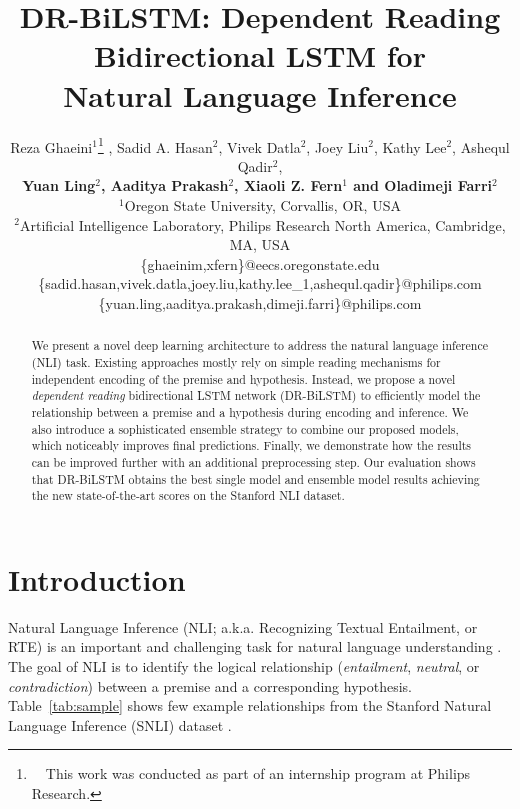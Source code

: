 \documentclass[11pt,a4paper]{article}
\title{DR-BiLSTM: Dependent Reading Bidirectional LSTM for \\ Natural Language Inference}
\author{
	Reza Ghaeini$^1$\thanks{\ \ This work was conducted as part of an internship program at Philips Research.} , Sadid A. Hasan$^2$, Vivek Datla$^2$, Joey Liu$^2$, Kathy Lee$^2$, Ashequl Qadir$^2$, \\ 
	\textbf{Yuan Ling$^2$, Aaditya Prakash$^2$, Xiaoli Z. Fern$^1$ and Oladimeji Farri$^2$} \\
	$^1$Oregon State University, Corvallis, OR, USA \\
	$^2$Artificial Intelligence Laboratory, Philips Research North America, Cambridge, MA, USA \\
	\{ghaeinim,xfern\}@eecs.oregonstate.edu \\
	\{sadid.hasan,vivek.datla,joey.liu,kathy.lee\_1,ashequl.qadir\}@philips.com \\
	\{yuan.ling,aaditya.prakash,dimeji.farri\}@philips.com
}
\date{}
\begin{document}
	\maketitle
	\begin{abstract}		
		We present a novel deep learning architecture to address the natural language inference (NLI) task. Existing approaches mostly rely on simple reading mechanisms for independent encoding of the premise and hypothesis. Instead, we propose a novel \emph{dependent reading} bidirectional LSTM network (DR-BiLSTM) to efficiently model the relationship between a premise and a hypothesis during encoding and inference. We also introduce a sophisticated ensemble strategy to combine our proposed models, which noticeably improves final predictions. Finally, we demonstrate how the results can be improved further with an additional preprocessing step. Our evaluation shows that DR-BiLSTM obtains the best single model and ensemble model results achieving the new state-of-the-art scores on the Stanford NLI dataset.
		
	\end{abstract}
	
	\section{Introduction}
	Natural Language Inference (NLI; a.k.a. Recognizing Textual Entailment, or RTE) is an important and challenging task for natural language understanding \cite{nli}. The goal of NLI is to identify the logical relationship (\emph{entailment}, \emph{neutral}, or \emph{contradiction}) between a premise and a corresponding hypothesis. Table~\ref{tab:sample} shows few example relationships from the Stanford Natural Language Inference (SNLI) dataset \cite{snli}.
	
\end{document}
